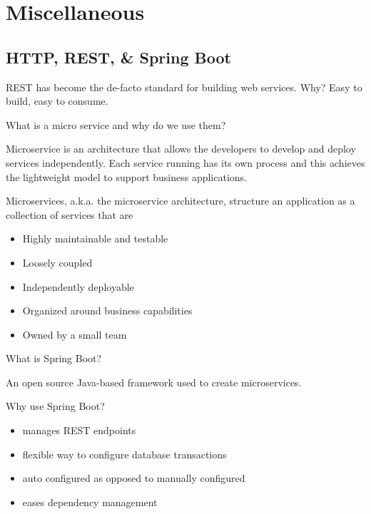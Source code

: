 \chapter{Miscellaneous}


\section{HTTP, REST, \& Spring Boot}

\begin{quest}
\item \cloze
REST has become the de-facto standard for building web services. Why? Easy to build, easy to consume.

\item
What is a micro service and why do we use them?
\begin{ans}
Microservice is an architecture that allows the developers to develop and deploy services independently. Each service running has its own process and this achieves the lightweight model to support business applications.

Microservices, a.k.a. the microservice architecture, structure an application as a collection of services that are
	\begin{itemize}
	\item Highly maintainable and testable
	\item Loosely coupled
	\item Independently deployable
	\item Organized around business capabilities
	\item Owned by a small team
	\end{itemize}
\end{ans}

\item What is Spring Boot?
\begin{ans}
An open source Java-based framework used to create microservices.
\end{ans}

\item Why use Spring Boot?
\begin{ans}
	\begin{itemize}
	\item manages REST endpoints
	\item flexible way to configure database transactions
	\item auto configured as opposed to manually configured
	\item eases dependency management
	\end{itemize}
\end{ans}


\end{quest}
